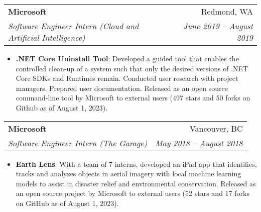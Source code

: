 \documentclass[letterpaper,11pt]{article}
\makeatletter
\newcommand{\resumeItem}[2]{
  \item\small{
    \textbf{#1}{: #2 \vspace{-2pt}}
  }
}
\newcommand{\resumeSubheading}[4]{
  \vspace{-1pt}\item
    \begin{tabular*}{0.97\textwidth}{l@{\extracolsep{\fill}}r}
      \textbf{#1} & #2 \\
      \textit{\small#3} & \textit{\small #4} \\
    \end{tabular*}\vspace{-5pt}
}
\newcommand{\resumeItemListStart}{\begin{itemize}}
\newcommand{\resumeItemListEnd}{\end{itemize}\vspace{-5pt}}
\makeatother
\begin{document}
    \resumeSubheading
      {Microsoft}{Redmond, WA}
      {Software Engineer Intern (Cloud and Artificial Intelligence)}{June 2019 -- August 2019}
      \resumeItemListStart
        \resumeItem{.NET Core Uninstall Tool}
          {Developed a guided tool that enables the controlled clean-up of a system such that only the desired versions of .NET Core SDKs and Runtimes remain. Conducted user research with project managers. Prepared user documentation. Released as an open source command-line tool by Microsoft to external users (497 stars and 50 forks on Github as of August 1, 2023).}
      \resumeItemListEnd

    \resumeSubheading
      {Microsoft}{Vancouver, BC}
      {Software Engineer Intern (The Garage)}{May 2018 -- August 2018}
      \resumeItemListStart
        \resumeItem{Earth Lens}
          {With a team of 7 interns, developed an iPad app that identifies, tracks and analyzes objects in aerial imagery with local machine learning models to assist in disaster relief and environmental conservation. Released as an open source project by Microsoft to external users (52 stars and 17 forks on GitHub as of August 1, 2023).}
      \resumeItemListEnd


\end{document}
